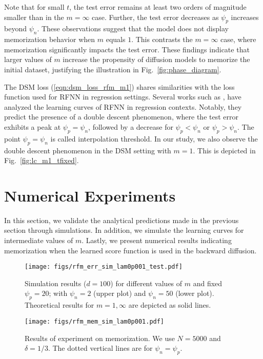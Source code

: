 Note that for small $t$, the test error remains at least two orders of magnitude smaller than in the $m=\infty$ case. Further, the test error decreases  as $\psi_p$ increases beyond $\psi_n$. These observations suggest that the model does not display memorization behavior when $m$ equals $1$. This contrasts the $m=\infty$ case, where memorization significantly impacts the test error. These findings indicate that larger values of $m$ increase the propensity of diffusion models to memorize the initial dataset, justifying the illustration in Fig.~\ref{fig:phase_diagram}.

The DSM loss (\ref{eqn:dsm_loss_rfm_m1}) shares similarities with the loss function used for RFNN in regression settings. Several works such as \cite{mei_generalization_2022, bodin_model_2021, hu_asymptotics_2024}, have analyzed the learning curves of RFNN in regression contexts. Notably, they predict the presence of a double descent phenomenon, where the test error exhibits a peak at $\psi_p=\psi_n$, followed by a decrease for $\psi_p<\psi_n$ or $\psi_p>\psi_n$. The point $\psi_p=\psi_n$ is called interpolation threshold. In our study, we also observe the double descent phenomenon in the DSM setting with $m=1$. This is depicted in Fig.~\ref{fig:lc_m1_tfixed}. 

\section{Numerical Experiments}
In this section, we validate the analytical predictions made in the previous section through simulations. In addition, we simulate the learning curves for intermediate values of $m$. Lastly, we present numerical results indicating memorization when the learned score function is used in the backward diffusion.
\begin{figure}[ht]
    \centering
     \texttt{[image: figs/rfm\_err\_sim\_lam0p001\_test.pdf]}
    \caption{Simulation results ($d=100$) for different values of $m$ and fixed $\psi_p=20$; with $\psi_n=2$ (upper plot) and $\psi_n=50$ (lower plot). Theoretical results for $m=1,\infty$ are depicted as solid lines.}
    \label{fig:lc_sim}
\end{figure}

\begin{figure}
    \centering
    \texttt{[image: figs/rfm\_mem\_sim\_lam0p001.pdf]}
    \caption{Results of experiment on memorization. We use $N=5000$ and $\delta=1/3$. The dotted vertical lines are for $\psi_n=\psi_p$.}
    \label{fig:mem_sim}
\end{figure}

